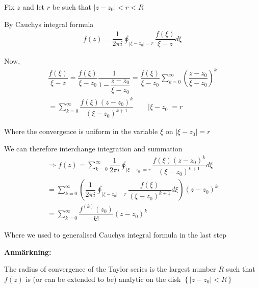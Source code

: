 \begin{prf}[]{}
  Fix $z$ and let $r$ be such that $\left|z-z_0\right|<r<R$
  \par\bigskip
  \noindent By Cauchys integral formula
  \begin{equation*}
    \begin{gathered}
      f(z) = \dfrac{1}{2\pi i}\oint_{\left|\xi-z_0\right| = r}\dfrac{f(\xi)}{\xi-z}d\xi
    \end{gathered}
  \end{equation*}
  \par\bigskip
  \noindent Now,
  \begin{equation*}
    \begin{gathered}
      \dfrac{f(\xi)}{\xi-z} = \dfrac{f(\xi)}{\xi-z_0}\dfrac{1}{1-\dfrac{z-z_0}{\xi-z_0}} = \dfrac{f(\xi)}{\xi-z_0}\sum_{k=0}^{\infty}\left(\dfrac{z-z_0}{\xi-z_0}\right)^k\\
      = \sum_{k=0}^{\infty}\dfrac{f(\xi)(z-z_0)^k}{(\xi-z_0)^{k+1}}\qquad \left|\xi-z_0\right| = r
    \end{gathered}
  \end{equation*}
  \par\bigskip
  \noindent Where the convergence is uniform in the variable $\xi$ on $\left|\xi-z_0\right| = r$\par
  \noindent We can therefore interchange integration and summation
  \begin{equation*}
    \begin{gathered}
      \Rightarrow f(z) = \sum_{k=0}^{\infty}\dfrac{1}{2\pi i}\oint_{\left|\xi-z_0\right| = r}\dfrac{f(\xi)(z-z_0)^k}{(\xi-z_0)^{k+1}}d\xi\\
      = \sum_{k=0}^{\infty}\left(\dfrac{1}{2\pi i}\oint_{\left|\xi-z_0\right| = r}\dfrac{f(\xi)}{(\xi-z_0)^{k+1}}d\xi\right)(z-z_0)^k\\
      = \sum_{k=0}^{\infty}\dfrac{f^{(k)}(z_0)}{k!}(z-z_0)^k
    \end{gathered}
  \end{equation*}
  \par\bigskip
  \noindent Where we used to generalised Cauchys integral formula in the last step
\end{prf}
\par\bigskip
\noindent\textbf{Anmärkning:}\par
\noindent The radius of convergence of the Taylor series is the largest number $R$  such that $f(z)$ is (or can be extended to be) analytic on the disk $\left\{\left|z-z_0\right|<R\right\}$
\par\bigskip
